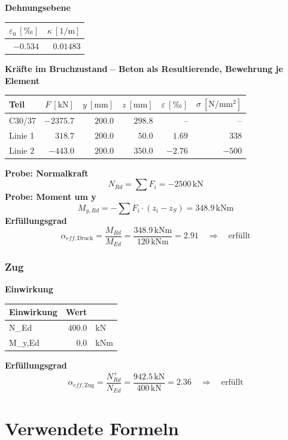 \documentclass[11pt,a4paper]{article}
\begin{document}
\noindent\textbf{Dehnungsebene}
\begin{longtable}{rr}
\hline
$\varepsilon_0\ [\text{‰}]$ & $\kappa\ [\mathrm{1/m}]$ \\
\hline
\endhead
$-0.534$ & $0.01483$ \\
\hline
\end{longtable}
\noindent\textbf{Kräfte im Bruchzustand -- Beton als Resultierende, Bewehrung je Element}
\begin{longtable}{lrrrrr}
\hline
Teil & $F\ [\mathrm{kN}]$ & $y\ [\mathrm{mm}]$ & $z\ [\mathrm{mm}]$ & $\varepsilon\ [\text{‰}]$ & $\sigma\ [\mathrm{N/mm^2}]$ \\
\hline
\endhead
C30/37 & $-2375.7$ & $200.0$ & $298.8$ & – & – \\
Linie 1 & $318.7$ & $200.0$ & $50.0$ & $1.69$ & $338$ \\
Linie 2 & $-443.0$ & $200.0$ & $350.0$ & $-2.76$ & $-500$ \\
\hline
\end{longtable}
\noindent\textbf{Probe: Normalkraft}
\begin{equation*}
N_{Rd} = \sum F_i = -2500\,\mathrm{kN}
\end{equation*}
\noindent\textbf{Probe: Moment um y}
\begin{equation*}
M_{y,Rd} = -\sum F_i \cdot (z_i - z_S) = 348.9\,\mathrm{kNm}
\end{equation*}
\noindent\textbf{Erfüllungsgrad}
\begin{equation*}
\alpha_{eff,\text{Druck}} = \frac{M_{Rd}}{M_{Ed}} = \frac{348.9\,\mathrm{kNm}}{120\,\mathrm{kNm}} = 2.91 \quad \Rightarrow \quad \text{erfüllt}
\end{equation*}
\subsubsection{Zug}
\noindent\textbf{Einwirkung}
\begin{longtable}{lrl}
\hline
Einwirkung & Wert &  \\
\hline
\endhead
N\_Ed & $400.0$ & kN \\
M\_y,Ed & $0.0$ & kNm \\
\hline
\end{longtable}
\noindent\textbf{Erfüllungsgrad}
\begin{equation*}
\alpha_{eff,\text{Zug}} = \frac{N_{Rd}^{+}}{N_{Ed}} = \frac{942.5\,\mathrm{kN}}{400\,\mathrm{kN}} = 2.36 \quad \Rightarrow \quad \text{erfüllt}
\end{equation*}
\section{Verwendete Formeln}
\end{document}
